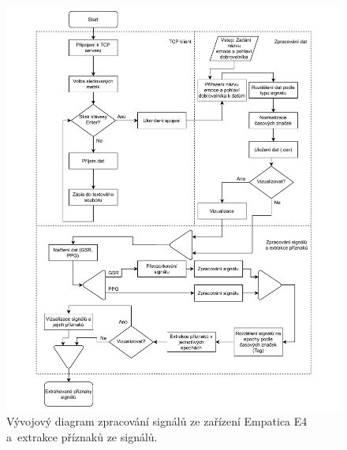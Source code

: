     \begin{figure}[H]
        \centering
        \includegraphics[width=\textwidth]{obrazky-figures/data_processing.pdf}
        \caption{Vývojový diagram zpracování signálů ze zařízení Empatica E4 a~extrakce příznaků ze signálů.}
        \label{fig:data_processing}
    \end{figure}
    
    
    
    
    

    
    
    
    
    
    
    
    
    
    
    
    
    
    
    
    
    
    
    
    
    
    